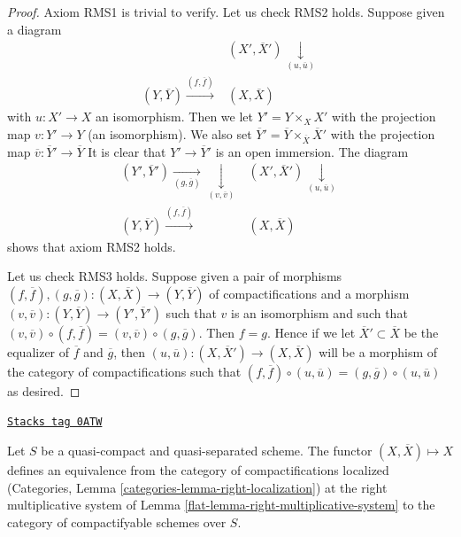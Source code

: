 \begin{proof}
Axiom RMS1 is trivial to verify. Let us check RMS2 holds.
Suppose given a diagram
$$
\begin{array}{cc} & (X', \overline{X}') \underset{(u, \overline{u})}{\downarrow} \\ (Y, \overline{Y}) \overset{(f, \overline{f})}{\longrightarrow} & (X, \overline{X})\end{array}
$$
with $u : X' \to X$ an isomorphism. Then we let $Y' = Y \times_X X'$
with the projection map $v : Y' \to Y$ (an isomorphism). We also
set $\overline{Y}' = \overline{Y} \times_{\overline{X}} \overline{X}'$
with the projection map $\overline{v} : \overline{Y}' \to \overline{Y}$
It is clear that $Y' \to \overline{Y}'$ is an open immersion.
The diagram
$$
\begin{array}{cc}(Y', \overline{Y}') \underset{(g, \overline{g})}{\longrightarrow}\underset{(v, \overline{v})}{\downarrow} & (X', \overline{X}') \underset{(u, \overline{u})}{\downarrow} \\ (Y, \overline{Y}) \overset{(f, \overline{f})}{\longrightarrow} & (X, \overline{X})\end{array}
$$
shows that axiom RMS2 holds.

\medskip\noindent
Let us check RMS3 holds. Suppose given a pair of morphisms
$(f, \overline{f}), (g, \overline{g}) :
(X, \overline{X}) \to (Y, \overline{Y})$
of compactifications and a morphism
$(v, \overline{v}) : (Y, \overline{Y}) \to (Y', \overline{Y}')$
such that $v$ is an isomorphism and such that
$(v, \overline{v}) \circ (f, \overline{f}) =
(v, \overline{v}) \circ (g, \overline{g})$. Then $f = g$.
Hence if we let $\overline{X}' \subset \overline{X}$
be the equalizer of $\overline{f}$ and $\overline{g}$,
then $(u, \overline{u}) : (X, \overline{X}') \to (X, \overline{X})$
will be a morphism of the category of compactifications
such that $(f, \overline{f}) \circ (u, \overline{u}) =
(g, \overline{g}) \circ (u, \overline{u})$ as desired.
\end{proof}

\begin{lemma}
\label{flat-lemma-invert-right-multiplicative-system}
\href{https://stacks.math.columbia.edu/tag/0ATW}{\texttt{Stacks tag 0ATW}}

Let $S$ be a quasi-compact and quasi-separated scheme.
The functor $(X, \overline{X}) \mapsto X$ defines an
equivalence from the category of compactifications localized
(Categories, Lemma \ref{categories-lemma-right-localization})
at the right
multiplicative system of Lemma \ref{flat-lemma-right-multiplicative-system}
to the category of compactifyable schemes over $S$.
\end{lemma}

